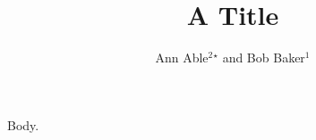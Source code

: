 \documentclass{revtex4-2}
\begin{document}
\title{A Title}
\author{Ann Able${}^{2}{}^{\star}$ and Bob Baker$^{1}$}
\maketitle
Body.
\end{document}
